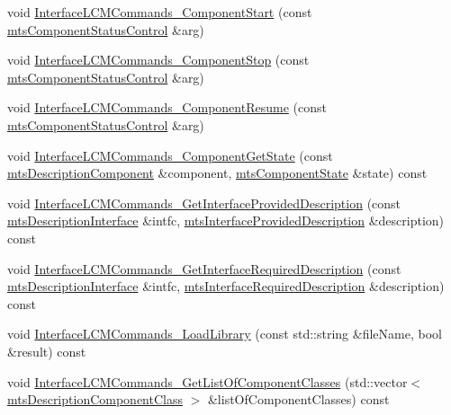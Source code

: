 \begin{DoxyCompactItemize}
\item 
void \hyperlink{classmts_manager_component_client_aa4241a0b7f26c01813bf25f3b720d4c8}{Interface\-L\-C\-M\-Commands\-\_\-\-Component\-Start} (const \hyperlink{classmts_component_status_control}{mts\-Component\-Status\-Control} \&arg)
\item 
void \hyperlink{classmts_manager_component_client_a96cc2f0e018d2ce86954aa69b1cd295a}{Interface\-L\-C\-M\-Commands\-\_\-\-Component\-Stop} (const \hyperlink{classmts_component_status_control}{mts\-Component\-Status\-Control} \&arg)
\item 
void \hyperlink{classmts_manager_component_client_a824231e5ba9b118b7c5386ff43a21ceb}{Interface\-L\-C\-M\-Commands\-\_\-\-Component\-Resume} (const \hyperlink{classmts_component_status_control}{mts\-Component\-Status\-Control} \&arg)
\item 
void \hyperlink{classmts_manager_component_client_a08e7f4f67ce5abb34704414d0a366630}{Interface\-L\-C\-M\-Commands\-\_\-\-Component\-Get\-State} (const \hyperlink{classmts_description_component}{mts\-Description\-Component} \&component, \hyperlink{classmts_component_state}{mts\-Component\-State} \&state) const 
\item 
void \hyperlink{classmts_manager_component_client_ae61750376c43687ea7699fd5c990b238}{Interface\-L\-C\-M\-Commands\-\_\-\-Get\-Interface\-Provided\-Description} (const \hyperlink{classmts_description_interface}{mts\-Description\-Interface} \&intfc, \hyperlink{classmts_interface_provided_description}{mts\-Interface\-Provided\-Description} \&description) const 
\item 
void \hyperlink{classmts_manager_component_client_a1cccf382e2bfdd52e8f3d03cfeaf0c9d}{Interface\-L\-C\-M\-Commands\-\_\-\-Get\-Interface\-Required\-Description} (const \hyperlink{classmts_description_interface}{mts\-Description\-Interface} \&intfc, \hyperlink{classmts_interface_required_description}{mts\-Interface\-Required\-Description} \&description) const 
\item 
void \hyperlink{classmts_manager_component_client_ab928599ba071eafb6250534a641b5296}{Interface\-L\-C\-M\-Commands\-\_\-\-Load\-Library} (const std\-::string \&file\-Name, bool \&result) const 
\item 
void \hyperlink{classmts_manager_component_client_a8e82f0a9027807c37594cb4f5ce4f499}{Interface\-L\-C\-M\-Commands\-\_\-\-Get\-List\-Of\-Component\-Classes} (std\-::vector$<$ \hyperlink{classmts_description_component_class}{mts\-Description\-Component\-Class} $>$ \&list\-Of\-Component\-Classes) const 

\end{DoxyCompactItemize}
